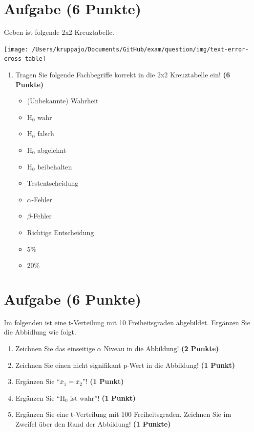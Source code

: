 \documentclass[a4paper, 10pt]{scrartcl}\usepackage[]{graphicx}\usepackage[]{xcolor}
\begin{document}
\section{Aufgabe \hfill (6 Punkte)}



Geben ist folgende 2x2 Kreuztabelle. 

\begin{center}
  \texttt{[image: /Users/kruppajo/Documents/GitHub/exam/question/img/text-error-cross-table]}
\end{center}

\begin{enumerate}
\item Tragen Sie folgende Fachbegriffe korrekt in die 2x2 Kreuztabelle ein! \textbf{(6 Punkte)}
  \begin{itemize}
  \item (Unbekannte) Wahrheit	
  \item H$_0$ wahr
  \item H$_0$ falsch
  \item H$_0$ abgelehnt
  \item H$_0$ beibehalten
  \item Testentscheidung
  \item $\alpha$-Fehler
  \item $\beta$-Fehler
  \item Richtige Entscheidung
  \item 5\%
  \item 20\%
  \end{itemize}
\end{enumerate}



 
\clearpage

\section{Aufgabe \hfill (6 Punkte)}



Im folgenden ist eine t-Verteilung mit 10 Freiheitsgraden
abgebildet. Erg{\"a}nzen Sie die Abbidlung wie folgt.

\begin{enumerate}
\item Zeichnen Sie das einseitige $\alpha$ Niveau in die Abbildung! \textbf{(2 Punkte)} 
\item Zeichnen Sie einen nicht signifikant p-Wert in die Abbildung! \textbf{(1 Punkt)} 
\item Erg{\"a}nzen Sie "`$\bar{x}_1 = \bar{x}_2$"'! \textbf{(1 Punkt)} 
\item Erg{\"a}nzen Sie "`H$_0$ ist wahr"'! \textbf{(1 Punkt)} 
\item Erg{\"a}nzen Sie eine t-Verteilung mit 100
  Freiheitsgraden. Zeichnen Sie im Zweifel {\"u}ber den Rand der Abbildung! \textbf{(1 Punkte)} 
\end{enumerate}
\end{document}

